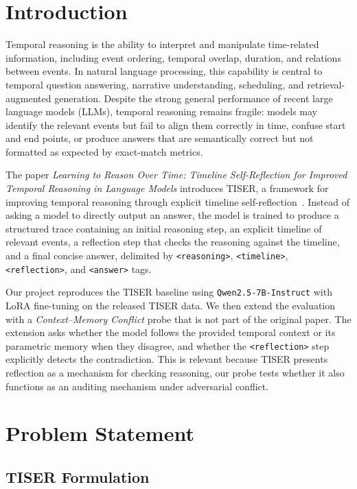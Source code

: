 \documentclass[conference]{IEEEtran}
\begin{document}
\section{Introduction}

Temporal reasoning is the ability to interpret and manipulate time-related information, including event ordering, temporal overlap, duration, and relations between events. In natural language processing, this capability is central to temporal question answering, narrative understanding, scheduling, and retrieval-augmented generation. Despite the strong general performance of recent large language models (LLMs), temporal reasoning remains fragile: models may identify the relevant events but fail to align them correctly in time, confuse start and end points, or produce answers that are semantically correct but not formatted as expected by exact-match metrics.

The paper \emph{Learning to Reason Over Time: Timeline Self-Reflection for Improved Temporal Reasoning in Language Models} introduces TISER, a framework for improving temporal reasoning through explicit timeline self-reflection~\cite{bazaga2025tiser}. Instead of asking a model to directly output an answer, the model is trained to produce a structured trace containing an initial reasoning step, an explicit timeline of relevant events, a reflection step that checks the reasoning against the timeline, and a final concise answer, delimited by \texttt{<reasoning>}, \texttt{<timeline>}, \texttt{<reflection>}, and \texttt{<answer>} tags.

Our project reproduces the TISER baseline using \texttt{Qwen2.5-7B-Instruct} with LoRA fine-tuning on the released TISER data. We then extend the evaluation with a \emph{Context--Memory Conflict} probe that is not part of the original paper. The extension asks whether the model follows the provided temporal context or its parametric memory when they disagree, and whether the \texttt{<reflection>} step explicitly detects the contradiction. This is relevant because TISER presents reflection as a mechanism for checking reasoning, our probe tests whether it also functions as an auditing mechanism under adversarial conflict.

\section{Problem Statement}

\subsection{TISER Formulation}
\end{document}
